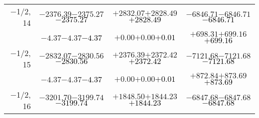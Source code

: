 \documentclass[compress]{beamer}
\begin{document}
\begin{frame}
{\begin{tabular}{r | c | c | c}
$-$1/2, 14 & $-2376.39$\hspace{0.1 cm}$-2375.27$\hspace{0.1 cm}\textcolor{black}{$-2375.27$} & $+2832.07$\hspace{0.1 cm}$+2828.49$\hspace{0.1 cm}\textcolor{black}{$+2828.49$} & $-6846.71$\hspace{0.1 cm}$-6846.71$\hspace{0.1 cm}\textcolor{black}{$-6846.71$} \\
           & $-4.37$\hspace{0.1 cm}$-4.37$\hspace{0.1 cm}\textcolor{black}{$-4.37$} & $+0.00$\hspace{0.1 cm}$+0.00$\hspace{0.1 cm}\textcolor{black}{$+0.01$} & $+698.31$\hspace{0.1 cm}$+699.16$\hspace{0.1 cm}\textcolor{black}{$+699.16$} \\
$-$1/2, 15 & $-2832.07$\hspace{0.1 cm}$-2830.56$\hspace{0.1 cm}\textcolor{black}{$-2830.56$} & $+2376.39$\hspace{0.1 cm}$+2372.42$\hspace{0.1 cm}\textcolor{black}{$+2372.42$} & $-7121.68$\hspace{0.1 cm}$-7121.68$\hspace{0.1 cm}\textcolor{black}{$-7121.68$} \\
           & $-4.37$\hspace{0.1 cm}$-4.37$\hspace{0.1 cm}\textcolor{black}{$-4.37$} & $+0.00$\hspace{0.1 cm}$+0.00$\hspace{0.1 cm}\textcolor{black}{$+0.01$} & $+872.84$\hspace{0.1 cm}$+873.69$\hspace{0.1 cm}\textcolor{black}{$+873.69$} \\
$-$1/2, 16 & $-3201.70$\hspace{0.1 cm}$-3199.74$\hspace{0.1 cm}\textcolor{black}{$-3199.74$} & $+1848.50$\hspace{0.1 cm}$+1844.23$\hspace{0.1 cm}\textcolor{black}{$+1844.23$} & $-6847.68$\hspace{0.1 cm}$-6847.68$\hspace{0.1 cm}\textcolor{black}{$-6847.68$} \\

\end{tabular}}
\end{frame}
\end{document}

